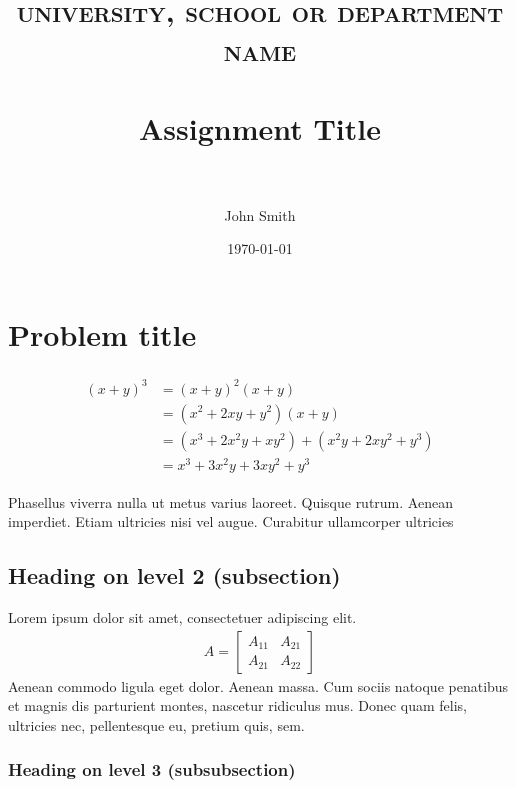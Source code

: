 \documentclass[paper=a4, fontsize=11pt]{scrartcl} %
\title{	
	\normalfont \normalsize 
	\textsc{university, school or department name} \\ [25pt] %
	\horrule{0.5pt} \\[0.4cm] %
	\huge Assignment Title \\ %
	\horrule{2pt} \\[0.5cm] %
}
\author{John Smith} %
\date{\normalsize\today} %
\numberwithin{equation}{section} %
\numberwithin{figure}{section} %
\numberwithin{table}{section} %
\begin{document}
	
	\maketitle %
	
	
	\section{Problem title}
	
	\lipsum[2] %
	
	\begin{align} 
	\begin{split}
	(x+y)^3 	&= (x+y)^2(x+y)\\
	&=(x^2+2xy+y^2)(x+y)\\
	&=(x^3+2x^2y+xy^2) + (x^2y+2xy^2+y^3)\\
	&=x^3+3x^2y+3xy^2+y^3
	\end{split}					
	\end{align}
	
	Phasellus viverra nulla ut metus varius laoreet. Quisque rutrum. Aenean imperdiet. Etiam ultricies nisi vel augue. Curabitur ullamcorper ultricies
	
	
	\subsection{Heading on level 2 (subsection)}
	
	Lorem ipsum dolor sit amet, consectetuer adipiscing elit. 
	\begin{align}
	A = 
	\begin{bmatrix}
	A_{11} & A_{21} \\
	A_{21} & A_{22}
	\end{bmatrix}
	\end{align}
	Aenean commodo ligula eget dolor. Aenean massa. Cum sociis natoque penatibus et magnis dis parturient montes, nascetur ridiculus mus. Donec quam felis, ultricies nec, pellentesque eu, pretium quis, sem.
	
	
	\subsubsection{Heading on level 3 (subsubsection)}
	
\end{document}

